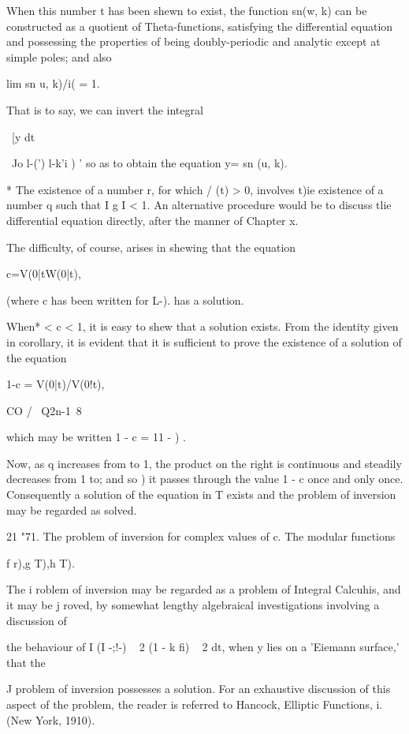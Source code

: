 When this number t has been shewn to exist, the function sn(w, k) can
be constructed as a quotient of Theta-functions, satisfying the
differential equation and possessing the properties of being
doubly-periodic and analytic except at simple poles; and also

lim sn u, k)/i( = 1.

That is to say, we can invert the integral

\ [y dt

 ~Jo l-(') l-k'i ) ' so as to obtain the equation y= sn (u, k).

* The existence of a number r, for which / (t) > 0, involves t)ie
existence of a number q such that I g I < 1. An alternative procedure
would be to discuss tlie differential equation directly, after the
manner of Chapter x.

%
%

The difficulty, of course, arises in shewing that the equation

c=V(0|tW(0|t),

(where c has been written for L-). has a solution.

When* < c < 1, it is easy to shew that a solution exists. From the
identity given in corollary, it is evident that it is sufficient
to prove the existence of a solution of the equation

1-c = V(0|t)/V(0!t),

CO / \ Q2n-1\ 8

which may be written 1 - c = 11 - ) .

Now, as q increases from to 1, the product on the right is continuous
and steadily decreases from 1 to; and so ) it passes through
the value 1 - c once and only once. Consequently a solution of the
equation in T exists and the problem of inversion may be regarded as
solved.

21 "71. The problem of inversion for complex values of c. The modular
functions

f r),g T),h T).

The i roblem of inversion may be regarded as a problem of Integral
Calcuhis, and it may be j roved, by somewhat lengthy algebraical
investigations involving a discussion of

the behaviour of I (I -;!-) ~ 2 (1 - k fi) ~ 2 dt, when y lies on a
'Eiemann surface,' that the

J problem of inversion possesses a solution. For an exhaustive
discussion of this aspect of the problem, the reader is referred to
Hancock, Elliptic Functions, i. (New York, 1910).

